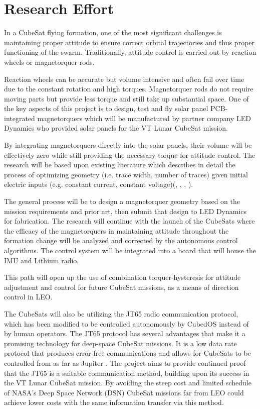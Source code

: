 \section{Research Effort}

In a CubeSat flying formation, one of the most significant challenges
is maintaining proper attitude to ensure correct orbital trajectories
and thus proper functioning of the swarm. Traditionally, attitude
control is carried out by reaction wheels or magnetorquer
rods.

Reaction wheels can be accurate but volume intensive and often
fail over time due to the constant rotation and high
torques. Magnetorquer rods do not require moving parts but provide
less torque and still take up substantial space. One of the key
aspects of this project is to design, test and fly solar panel
PCB-integrated magnetorquers which will be manufactured by partner
company LED Dynamics who provided solar panels for the VT Lunar
CubeSat mission.

By integrating magnetorquers directly into the solar panels, their
volume will be effectively zero while still providing the necessary
torque for attitude control. The research will be based upon existing
literature which describes in detail the process of optimizing
geometry (i.e. trace width, number of traces) given initial electric
inputs (e.g. constant current, constant voltage)(\cite{ali:2021},
\cite{khan:2022}, \cite{sokal:2019}, \cite{sorensen:2021}).

 The general process will be to design a magnetorquer geometry based
 on the mission requirements and prior art, then submit that design to
 LED Dynamics for fabrication. The research will continue with the
 launch of the CubeSats where the efficacy of the magnetorquers in
 maintaining attitude throughout the formation change will be analyzed
 and corrected by the autonomous control algorithms. The control
 system will be integrated into a board that will house the IMU and
 Lithium radio.

This path will open up the use of combination torquer-hysteresis for
attitude adjustment and control for future CubeSat missions, as a
means of direction control in LEO.

The CubeSats will also be utilizing the JT65 radio communication
protocol, which has been modified to be controlled autonomously by
CubedOS instead of by human operators. The JT65 protocol has several
advantages that make it a promising technology for deep-space CubeSat
missions. It is a low data rate protocol that produces error free
communications and allows for CubeSats to be controlled from as far as
Jupiter \cite{brandon:2019}. The project aims to provide continued
proof that the JT65 is a suitable communication method, building upon
its success in the VT Lunar CubeSat mission. By avoiding the steep
cost and limited schedule of NASA’s Deep Space Network (DSN) CubeSat
missions far from LEO could achieve lower costs with the same
information transfer via this method.

